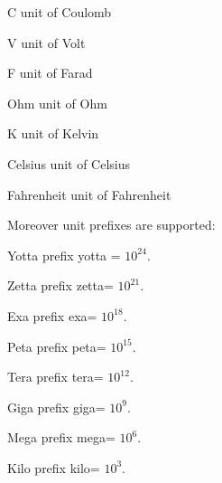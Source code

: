 \begin{datadesc}{C}
unit of Coulomb 
\end{datadesc}
\begin{datadesc}{V}
unit of Volt 
\end{datadesc}
\begin{datadesc}{F}
 unit of Farad 
\end{datadesc}

\begin{datadesc}{Ohm}
 unit of Ohm
\end{datadesc}
\begin{datadesc}{K}
unit of Kelvin 
\end{datadesc}
\begin{datadesc}{Celsius}
 unit of Celsius
\end{datadesc}

\begin{datadesc}{Fahrenheit}
unit of Fahrenheit 
\end{datadesc}

Moreover unit prefixes are supported:

\begin{datadesc}{Yotta}
prefix yotta = $10^{24}$.
 
\end{datadesc}

\begin{datadesc}{Zetta}
prefix zetta= $10^{21}$.
\end{datadesc}

\begin{datadesc}{Exa}
prefix exa= $10^{18}$.
 \end{datadesc}

\begin{datadesc}{Peta}
prefix peta= $10^{15}$.
 \end{datadesc}

\begin{datadesc}{Tera}
prefix tera= $10^{12}$.
 \end{datadesc}

\begin{datadesc}{Giga}
prefix giga= $10^9$.
 \end{datadesc}

\begin{datadesc}{Mega}
prefix mega= $10^6$.
 \end{datadesc}

\begin{datadesc}{Kilo}
prefix kilo= $10^3$.
 \end{datadesc}

